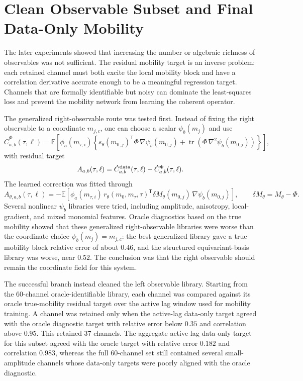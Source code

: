\documentclass[11pt]{article}
\newcommand{\E}{\mathbb{E}}
\newcommand{\T}{\mathsf{T}}
\begin{document}
\section{Clean Observable Subset and Final Data-Only Mobility}

The later experiments showed that increasing the number or algebraic richness
of observables was not sufficient.  The residual mobility target is an inverse
problem: each retained channel must both excite the local mobility block and
have a correlation derivative accurate enough to be a meaningful regression
target.  Channels that are formally identifiable but noisy can dominate the
least-squares loss and prevent the mobility network from learning the coherent
operator.

The generalized right-observable route was tested first.  Instead of fixing the
right observable to a coordinate \(m_{j,c}\), one can choose a scalar
\(\psi_b(m_j)\) and use
\[
  \dot C_{a,b}^{\Phi}(\tau,\ell)
  =
  \E\!\left[
  \phi_a(m_{\tau,i})
  \left\{
  s_\theta(m_{0,j})^\T \Phi\,\nabla\psi_b(m_{0,j})
  +
  \operatorname{tr}\!\left(\Phi\,\nabla^2\psi_b(m_{0,j})\right)
  \right\}\right],
\]
with residual target
\[
  A_{a,b}(\tau,\ell)
  =
  \dot C_{a,b}^{\rm data}(\tau,\ell)
  -
  \dot C_{a,b}^{\Phi}(\tau,\ell).
\]
The learned correction was fitted through
\[
  A_{\theta,a,b}(\tau,\ell)
  =
  -\E\!\left[
  \phi_a(m_{\tau,i})\,
  r_\theta(m_0,m_\tau,\tau)^\T
  \delta M_\theta(m_{0,j})\,\nabla\psi_b(m_{0,j})
  \right],
  \qquad \delta M_\theta=M_\theta-\Phi .
\]
Several nonlinear \(\psi_b\) libraries were tried, including amplitude,
anisotropy, local-gradient, and mixed monomial features.  Oracle diagnostics
based on the true mobility showed that these generalized right-observable
libraries were worse than the coordinate choice \(\psi_b(m_j)=m_{j,c}\): the
best generalized library gave a true-mobility block relative error of about
\(0.46\), and the structured equivariant-basis library was worse, near \(0.52\).
The conclusion was that the right observable should remain the coordinate field
for this system.

The successful branch instead cleaned the left observable library.  Starting
from the 60-channel oracle-identifiable library, each channel was compared
against its oracle true-mobility residual target over the active lag window used
for mobility training.  A channel was retained only when the active-lag
data-only target agreed with the oracle diagnostic target with relative error
below \(0.35\) and correlation above \(0.95\).  This retained 37 channels.  The
aggregate active-lag data-only target for this subset agreed with the oracle
target with relative error \(0.182\) and correlation \(0.983\), whereas the full
60-channel set still contained several small-amplitude channels whose data-only
targets were poorly aligned with the oracle diagnostic.
\end{document}
